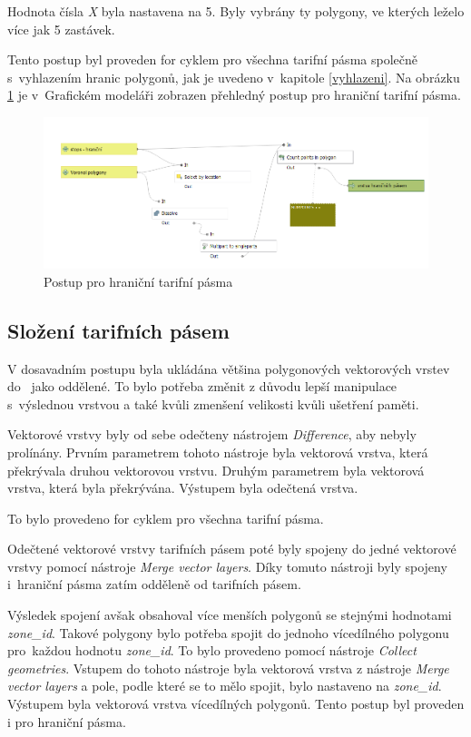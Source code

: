 Hodnota čísla \textit{X} byla nastavena na 5. Byly vybrány ty polygony, ve kterých leželo více jak 5 zastávek.

Tento postup byl proveden for cyklem pro všechna tarifní pásma společně s~vyhlazením hranic polygonů,
jak je uvedeno v~kapitole \ref{vyhlazeni}. Na obrázku \ref{fig:postup-border-zones} je v~Grafickém modeláři zobrazen
přehledný postup pro hraniční tarifní pásma. 

\begin{figure}[H] \centering
    \includegraphics[width=400pt]{./pictures/postup-border-zones.png}
    \caption[Postup pro hraniční tarifní pásma]{Postup pro hraniční tarifní pásma}
	\label{fig:postup-border-zones}              
\end{figure}

\subsection{Složení tarifních pásem}
\label{seskupeni}

V dosavadním postupu byla ukládána většina polygonových vektorových vrstev do~ jako oddělené.
To bylo potřeba změnit z důvodu lepší manipulace s~výslednou vrstvou a také kvůli zmenšení velikosti 
kvůli ušetření paměti.

Vektorové vrstvy byly od sebe odečteny nástrojem \textit{Difference}, aby nebyly prolínány. 
Prvním parametrem tohoto nástroje byla vektorová vrstva, která překrývala druhou vektorovou vrstvu. 
Druhým parametrem byla vektorová vrstva, která byla překrývána. Výstupem byla odečtená vrstva.

To bylo provedeno for cyklem pro všechna tarifní pásma.

Odečtené vektorové vrstvy tarifních pásem poté byly spojeny do jedné vektorové vrstvy pomocí 
nástroje \textit{Merge vector layers}. Díky tomuto nástroji byly spojeny i~hraniční pásma zatím odděleně od tarifních pásem.

Výsledek spojení avšak obsahoval více menších polygonů se stejnými hodnotami \textit{zone\_id}.
Takové polygony bylo potřeba spojit do jednoho vícedílného polygonu pro~každou hodnotu \textit{zone\_id}.
To bylo provedeno pomocí nástroje \textit{Collect geometries}. Vstupem do tohoto nástroje byla vektorová vrstva z 
nástroje \textit{Merge vector layers} a pole, podle které se to mělo spojit, bylo nastaveno na \textit{zone\_id}.
Výstupem byla vektorová vrstva vícedílných polygonů. Tento postup byl proveden i pro hraniční pásma.

